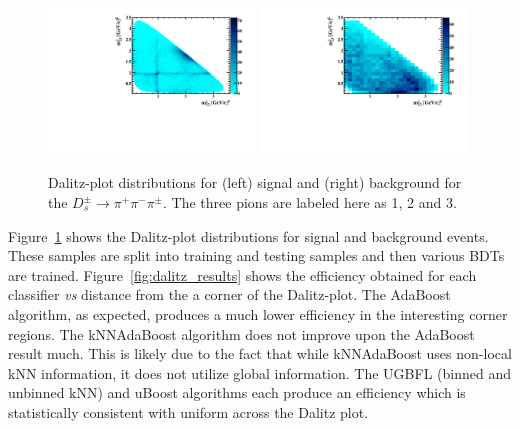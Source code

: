 \begin{figure}[] 
  \centering 
  \includegraphics[width=0.49\textwidth]{DP_sig.pdf}
  \includegraphics[width=0.49\textwidth]{DP_bkgd.pdf}
  \caption{\label{fig:dalitz} Dalitz-plot distributions for (left) signal and (right) background for the $D_s^\pm\to\pi^+\pi^-\pi^\pm$.  The three pions are labeled here as 1, 2 and 3.}
\end{figure}

Figure~\ref{fig:dalitz} shows the Dalitz-plot distributions for signal and background events.  These samples are split into training and testing samples and then various BDTs are trained.  Figure~\ref{fig:dalitz_results} shows the efficiency obtained for each classifier {\em vs} distance from the a corner of the Dalitz-plot.  The AdaBoost algorithm, as expected, produces a much lower efficiency in the interesting corner regions.  The kNNAdaBoost algorithm does not improve upon the AdaBoost result much.  This is likely due to the fact that while kNNAdaBoost uses non-local kNN information, it does not utilize global information.
The UGBFL (binned and unbinned kNN) and uBoost algorithms each produce an efficiency which is statistically consistent with uniform across the Dalitz plot.  


